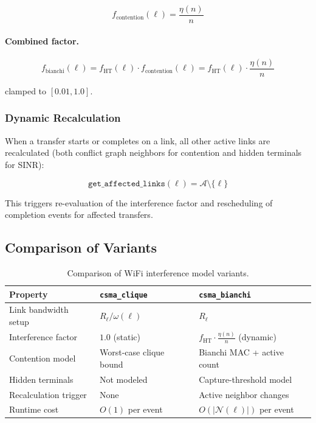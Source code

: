 \documentclass[11pt,letterpaper]{article}
\begin{document}
\begin{equation}
\label{eq:contention_factor}
f_\text{contention}(\ell) = \frac{\eta(n)}{n}
\end{equation}

\paragraph{Combined factor.}

\begin{equation}
\label{eq:combined_factor}
\boxed{f_\text{bianchi}(\ell) = f_\text{HT}(\ell) \cdot f_\text{contention}(\ell)
= f_\text{HT}(\ell) \cdot \frac{\eta(n)}{n}}
\end{equation}

clamped to $[0.01, 1.0]$.

\subsubsection{Dynamic Recalculation}

When a transfer starts or completes on a link, all other active links are
recalculated (both conflict graph neighbors for contention and hidden
terminals for SINR):

\begin{equation}
\texttt{get\_affected\_links}(\ell) = \mathcal{A} \setminus \{\ell\}
\end{equation}

This triggers re-evaluation of the interference factor and rescheduling of
completion events for affected transfers.

\subsection{Comparison of Variants}

\begin{table}[h]
\centering
\caption{Comparison of WiFi interference model variants.}
\label{tab:comparison}
\begin{tabular}{@{}lll@{}}
\toprule
\textbf{Property} & \textbf{\texttt{csma\_clique}} & \textbf{\texttt{csma\_bianchi}} \\
\midrule
Link bandwidth setup & $R_\ell / \omega(\ell)$ & $R_\ell$ \\
Interference factor  & $1.0$ (static) & $f_\text{HT} \cdot \frac{\eta(n)}{n}$ (dynamic) \\
Contention model     & Worst-case clique bound & Bianchi MAC + active count \\
Hidden terminals     & Not modeled & Capture-threshold model \\
Recalculation trigger & None & Active neighbor changes \\
Runtime cost         & $O(1)$ per event & $O(|\mathcal{N}(\ell)|)$ per event \\
\bottomrule
\end{tabular}
\end{table}
\end{document}
